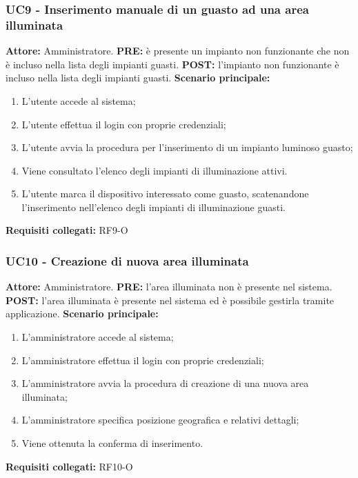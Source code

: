 \documentclass[a4paper, 12pt]{article}
\begin{document}
\subsubsection{UC9 - Inserimento manuale di un guasto ad una area illuminata}
\textbf{Attore:} Amministratore.\newline
\textbf{PRE:} è presente un impianto non funzionante che non è incluso nella lista degli impianti guasti.\newline
\textbf{POST:} l'impianto non funzionante è incluso nella lista degli impianti guasti.\newline
\textbf{Scenario principale:}
\begin{enumerate}
    \item L'utente accede al sistema;
    \item L'utente effettua il login con proprie credenziali;
    \item L'utente avvia la procedura per l’inserimento di un impianto luminoso guasto;
    \item Viene consultato l’elenco degli impianti di illuminazione attivi.
    \item L'utente marca il dispositivo interessato come guasto, scatenandone l’inserimento nell’elenco degli impianti di illuminazione guasti.
\end{enumerate}
\textbf{Requisiti collegati:} RF9-O\newline

\subsubsection{UC10 - Creazione di nuova area illuminata}
\textbf{Attore:} Amministratore.\newline
\textbf{PRE:} l'area illuminata non è presente nel sistema.\newline
\textbf{POST:} l'area illuminata è presente nel sistema ed è possibile gestirla tramite applicazione.\newline
\textbf{Scenario principale:}
\begin{enumerate}
    \item L'amministratore accede al sistema;
    \item L'amministratore effettua il login con proprie credenziali;
    \item L'amministratore avvia la procedura di creazione di una nuova area illuminata;
    \item L'amministratore specifica posizione geografica e relativi dettagli;
    \item Viene ottenuta la conferma di inserimento.
\end{enumerate}
\textbf{Requisiti collegati:} RF10-O\newline
\end{document}

